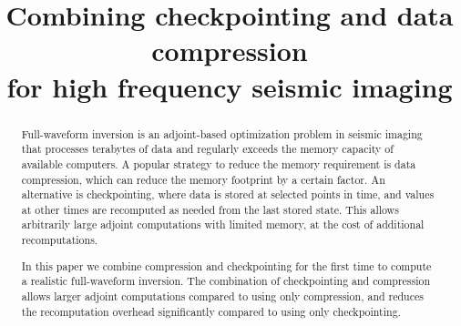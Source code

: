 \documentclass[conference]{IEEEtran}
\begin{document}
\title{Combining checkpointing and data compression\\ for high frequency seismic imaging
}

\author{
\and
{}
\and
{}
\and
{}
\and
{}
\and
{}
}

\maketitle

\begin{abstract}
Full-waveform inversion is an adjoint-based optimization problem in seismic
imaging that processes terabytes of data and regularly exceeds the memory
capacity of available computers. A popular strategy to reduce the memory
requirement is data compression, which can reduce the memory
footprint by a certain factor. An alternative is
checkpointing, where data is stored at selected points in
time, and values at other times are recomputed as needed from the last stored state.
This allows arbitrarily large adjoint computations with limited memory, at the cost
of additional recomputations.

In this paper we combine compression and checkpointing for the first
time to compute a realistic full-waveform inversion. The combination of
checkpointing and compression allows
larger adjoint computations compared to using only compression, and
reduces the recomputation overhead significantly compared to using only checkpointing.

\end{abstract}
\end{document}
